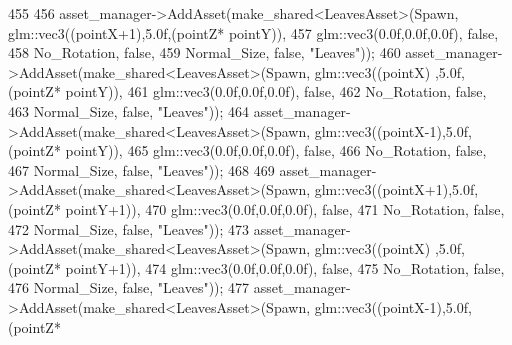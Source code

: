 \begin{DoxyCode}
455 
456             asset\_manager->AddAsset(make\_shared<LeavesAsset>(Spawn, glm::vec3((pointX+1),5.0f,(pointZ*
      pointY)),
457                                                              glm::vec3(0.0f,0.0f,0.0f), \textcolor{keyword}{false},
458                                                              No\_Rotation, \textcolor{keyword}{false},
459                                                              Normal\_Size, \textcolor{keyword}{false}, \textcolor{stringliteral}{"Leaves"}));
460             asset\_manager->AddAsset(make\_shared<LeavesAsset>(Spawn, glm::vec3((pointX)  ,5.0f,(pointZ*
      pointY)),
461                                                              glm::vec3(0.0f,0.0f,0.0f), \textcolor{keyword}{false},
462                                                              No\_Rotation, \textcolor{keyword}{false},
463                                                              Normal\_Size, \textcolor{keyword}{false}, \textcolor{stringliteral}{"Leaves"}));
464             asset\_manager->AddAsset(make\_shared<LeavesAsset>(Spawn, glm::vec3((pointX-1),5.0f,(pointZ*
      pointY)),
465                                                              glm::vec3(0.0f,0.0f,0.0f), \textcolor{keyword}{false},
466                                                              No\_Rotation, \textcolor{keyword}{false},
467                                                              Normal\_Size, \textcolor{keyword}{false}, \textcolor{stringliteral}{"Leaves"}));
468  
469             asset\_manager->AddAsset(make\_shared<LeavesAsset>(Spawn, glm::vec3((pointX+1),5.0f,(pointZ*
      pointY+1)),
470                                                              glm::vec3(0.0f,0.0f,0.0f), \textcolor{keyword}{false},
471                                                              No\_Rotation, \textcolor{keyword}{false},
472                                                              Normal\_Size, \textcolor{keyword}{false}, \textcolor{stringliteral}{"Leaves"}));
473             asset\_manager->AddAsset(make\_shared<LeavesAsset>(Spawn, glm::vec3((pointX)  ,5.0f,(pointZ*
      pointY+1)),
474                                                              glm::vec3(0.0f,0.0f,0.0f), \textcolor{keyword}{false},
475                                                              No\_Rotation, \textcolor{keyword}{false},
476                                                              Normal\_Size, \textcolor{keyword}{false}, \textcolor{stringliteral}{"Leaves"}));
477             asset\_manager->AddAsset(make\_shared<LeavesAsset>(Spawn, glm::vec3((pointX-1),5.0f,(pointZ*

\end{DoxyCode}

